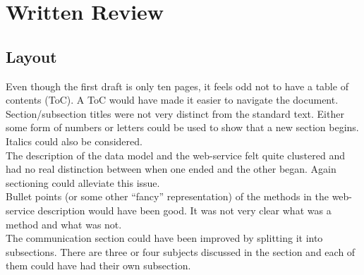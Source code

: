 \chapter{Written Review}
\label{Appendix_Review}
\section{Layout}
Even though the first draft is only ten pages, it feels odd not to have a table of contents (ToC). A ToC would have made it easier to navigate the document.\\
Section/subsection titles were not very distinct from the standard text. Either some form of numbers or letters could be used to show that a new section begins. Italics could also be considered.\\
The description of the data model and the web-service felt quite clustered and had no real distinction between when one ended and the other began. Again sectioning could alleviate this issue.\\
Bullet points (or some other “fancy” representation) of the methods in the web-service description would have been good. It was not very clear what was a method and what was not.\\
The communication section could have been improved by splitting it into subsections. There are three or four subjects discussed in the section and each of them could have had their own subsection.\\
